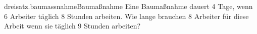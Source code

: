 \begin{exercise}{dreisatz.baumassnahme}{Baumaßnahme}
  \ifproblem\problem
    Eine Baumaßnahme dauert 4 Tage, wenn 6 Arbeiter täglich 8 Stunden arbeiten.
    Wie lange brauchen 8 Arbeiter für diese Arbeit wenn sie täglich 9 Stunden
    arbeiten?
  \fi
\end{exercise}
